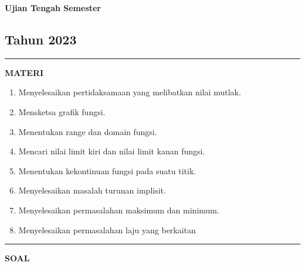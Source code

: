 \newpage
\begin{flushright}
    \textbf{\Large{Ujian Tengah Semester}}
    \subsection*{Tahun 2023}
\end{flushright}
\vspace{0.5cm}
\hrule height 2pt
\vspace{0.5cm}
\begin{center}
    \textbf{\large{MATERI}}
    \begin{enumerate}[leftmargin=*, label={\arabic*}.]
        \item Menyelesaikan pertidaksamaan yang melibatkan nilai mutlak.
        \item Mensketsa grafik fungsi.
        \item Menentukan range dan domain fungsi.
        \item Mencari nilai limit kiri dan nilai limit kanan fungsi.
        \item Menentukan kekontinuan fungsi pada suatu titik.
        \item Menyelesaikan masalah turunan implisit.
        \item Menyelesaikan permasalahan maksimum dan minimum.
        \item Menyelesaikan permasalahan laju yang berkaitan
    \end{enumerate}
\end{center}
\vspace{0.2cm}
\hrule height 1pt
\vspace{0.5cm}
\begin{center}
    \textbf{\large{SOAL}}
\end{center}
